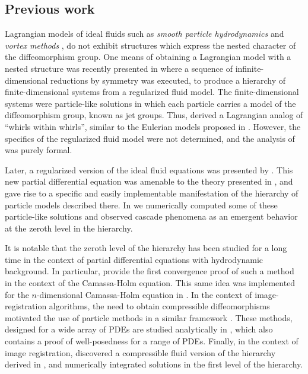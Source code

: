 \documentclass[12pt]{amsart}
\begin{document}
\subsection{Previous work}
  Lagrangian models of ideal fluids such as \emph{smooth particle hydrodynamics} \cite{Monaghan1977,Lucy1977} and
\emph{vortex methods} \cite{Chorin1973}, do not exhibit structures which express the nested character of the diffeomorphism group.
 One means of obtaining a Lagrangian model with a nested structure
 was recently presented in \cite{JacobsRatiuDesbrun2013}
 where a sequence of infinite-dimensional reductions by symmetry was
 executed, to produce a hierarchy of finite-dimensional systems from a
 regularized fluid model.
 The finite-dimensional systems were particle-like solutions
 in which each particle carries a model of the diffeomorphism group,
 known as jet groups.
 Thus, \cite{JacobsRatiuDesbrun2013} derived a Lagrangian analog of 
 ``whirls within whirls'', similar to the Eulerian models proposed
 in \cite{HolmTronci2012}.
 However, the specifics of the regularized fluid model were not determined,
 and the analysis of \cite{JacobsRatiuDesbrun2013} was purely
 formal.

 Later, a regularized version of the ideal fluid equations was presented by
 \cite{MumfordMichor2013}.
 This new partial differential equation was amenable to the theory presented in 
 \cite{JacobsRatiuDesbrun2013}, and gave rise to a specific and easily
 implementable manifestation of the hierarchy of particle models
 described there.
 In \cite{CotterHolmJacobsMeier2014} we numerically computed some
 of these particle-like solutions and observed cascade phenomena as
 an emergent behavior at the zeroth level in the hierarchy.

 It is notable that the zeroth level of the hierarchy has been studied
 for a long time in the context of partial differential equations with hydrodynamic background.
 In particular, \cite{HoldenRaynaud2006} provide the first convergence proof of such a method in the context of the Camassa-Holm equation.
 This same idea was implemented for the $n$-dimensional Camassa-Holm
 equation in \cite{ChertockDuToitMarsden2012}.
 In the context of image-registration algorithms, the need to obtain 
 compressible diffeomorphisms motivated the use of particle methods
 in a similar framework \cite{JoshiMiller2000}.
 These methods, designed for a wide array of PDEs are studied analytically
 in \cite{TrouveYounes2005}, which also contains a proof of well-posedness
 for a range of PDEs.
 Finally, in the context of image registration, \cite{Sommer2013} 
 discovered a compressible fluid version of the hierarchy derived in \cite{JacobsRatiuDesbrun2013},
 and numerically integrated solutions in the first level of the hierarchy.
\end{document}
